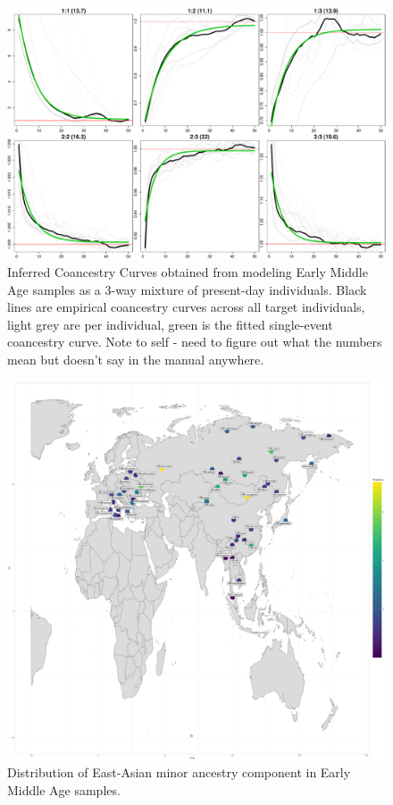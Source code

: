 \begin{figure}[htp]
    \centering
    \includegraphics[width=1.0\textwidth]{../images/chapter5/EarlyMiddleAges_3way_acoanc.pdf}
    \caption{Inferred Coancestry Curves obtained from modeling Early Middle Age samples as a 3-way mixture of present-day individuals. Black lines are empirical coancestry curves across all target individuals, light grey are per individual, green is the fitted single-event coancestry curve. Note to self - need to figure out what the numbers mean but doesn't say in the manual anywhere.}
    \label{fig:EarlyMiddleAges_MOSAIC_3way_moderns_acoanc}
\end{figure}

\begin{figure}[htp]
    \centering
    \includegraphics[width=1.0\textwidth]{../images/chapter5/EarlyMiddleAges_AdmixtureProportionsPlot.pdf}
    \caption{Distribution of East-Asian minor ancestry component in Early Middle Age samples.}
    \label{fig:EarlyMiddleAges_AdmixtureProportionsPlot}
\end{figure}

